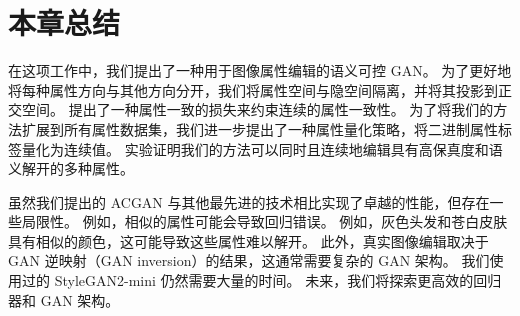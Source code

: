 \section{本章总结}
在这项工作中，我们提出了一种用于图像属性编辑的语义可控 GAN。 为了更好地将每种属性方向与其他方向分开，我们将属性空间与隐空间隔离，并将其投影到正交空间。 提出了一种属性一致的损失来约束连续的属性一致性。 为了将我们的方法扩展到所有属性数据集，我们进一步提出了一种属性量化策略，将二进制属性标签量化为连续值。 实验证明我们的方法可以同时且连续地编辑具有高保真度和语义解开的多种属性。

虽然我们提出的 ACGAN 与其他最先进的技术相比实现了卓越的性能，但存在一些局限性。 例如，相似的属性可能会导致回归错误。 例如，灰色头发和苍白皮肤具有相似的颜色，这可能导致这些属性难以解开。 此外，真实图像编辑取决于 GAN 逆映射（GAN inversion）的结果，这通常需要复杂的 GAN 架构。 我们使用过的 StyleGAN2-mini 仍然需要大量的时间。 未来，我们将探索更高效的回归器和 GAN 架构。
